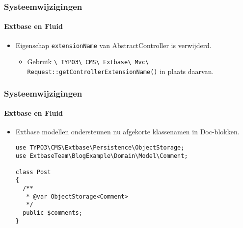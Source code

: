 \begin{frame}[fragile]
	\frametitle{Systeemwijzigingen}
	\framesubtitle{Extbase en Fluid}

	\begin{itemize}
		\item Eigenschap \texttt{extensionName} van AbstractController is verwijderd.

			\begin{itemize}\smaller
				\item[\ding{228}] Gebruik \texttt{\textbackslash
					TYPO3\textbackslash
					CMS\textbackslash
					Extbase\textbackslash
					Mvc\textbackslash
					Request::getControllerExtensionName()} in plaats daarvan.
			\end{itemize}\normalsize

	\end{itemize}

\end{frame}


\begin{frame}[fragile]
	\frametitle{Systeemwijzigingen}
	\framesubtitle{Extbase en Fluid}

	\lstset{basicstyle=\tiny\ttfamily}

	\begin{itemize}
		\item Extbase modellen ondersteunen nu afgekorte klassenamen in Doc-blokken.
\begin{lstlisting}
use TYPO3\CMS\Extbase\Persistence\ObjectStorage;
use ExtbaseTeam\BlogExample\Domain\Model\Comment;

class Post
{
  /**
   * @var ObjectStorage<Comment>
   */
  public $comments;
}
\end{lstlisting}

	\end{itemize}

\end{frame}


